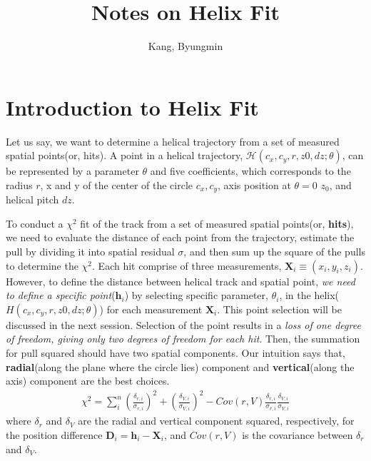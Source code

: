 \documentclass{article}
\title{Notes on Helix Fit}
\author{Kang, Byungmin}
\begin{document}
	\maketitle
	\section{Introduction to Helix Fit}
	Let us say, we want to determine a helical trajectory from a set of measured spatial points(or, hits). A point in a helical trajectory, $\mathcal H(c_x,c_y,r,z0,dz;\theta)$, can be represented by a parameter $\theta$ and five coefficients, which corresponds to the radius $r$, x and y of the center of the circle $c_x,c_y$, axis position at $\theta=0$ $z_0$, and helical pitch $dz$.
	
	To conduct a $\chi^2$ fit of the track from a set of measured spatial points(or, \textbf{hits}), we need to evaluate the distance of each point from the trajectory, estimate the pull by dividing it into spatial residual $\sigma$, and then sum up the square of the pulls to determine the $\chi^2$. Each hit comprise of three measurements, $\mathbf X_i \equiv (x_i,y_i,z_i)$. However, to define the distance between helical track and spatial point, \textit{we need to define a specific point}($\mathbf{h}_i$) by selecting specific parameter, $\theta_i$, in the helix($H(c_x,c_y,r,z0,dz;\theta)$) for each measurement $\mathbf X_i$. This point selection will be discussed in the next session. Selection of the point results in a \textit{loss of one degree of freedom, giving only two degrees of freedom for each hit}. Then, the summation for pull squared should have two spatial components. Our intuition says that, \textbf{radial}(along the plane where the circle lies) component and \textbf{vertical}(along the axis) component are the best choices.
	\begin{align}
		\chi^2 = \sum_i^n(\frac{\delta_{r,i}}{\sigma_{r,i}})^2 + (\frac{\delta_{V,i}}{\sigma_{V,i}})^2 - Cov(r,V)\frac{\delta_{r,i}}{\sigma_{r,i}}\frac{\delta_{V,i}}{\sigma_{V,i}}\label{chi2}
	\end{align}
	where $\delta_r$ and $\delta_V$ are the radial and vertical component squared, respectively, for the position difference $\mathbf{D}_i = \mathbf{h}_i - \mathbf{X}_i$, and $Cov(r,V)$ is the covariance between $\delta_r$ and $\delta_V$. 
\end{document}
